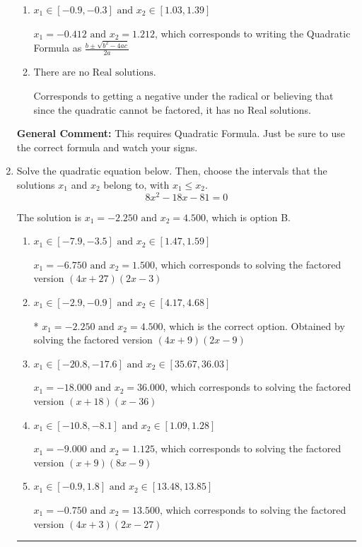 \documentclass{extbook}[14pt]
\newcommand{\litem}[1]{\item #1

\rule{\textwidth}{0.4pt}}
\begin{document}
\begin{enumerate}
{\begin{enumerate}[label=\Alph*.]
 $x_1 = -4.124 \text{ and } x_2 = 12.124$, which corresponds to using the Quadratic Formula with $a=1$
\item \( x_1 \in [-0.9, -0.3] \text{ and } x_2 \in [1.03, 1.39] \)

 $x_1 = -0.412 \text{ and } x_2 = 1.212$, which corresponds to writing the Quadratic Formula as $\frac{b \pm \sqrt{b^2 - 4ac}}{2a}$
\item \( \text{There are no Real solutions.} \)

Corresponds to getting a negative under the radical or believing that since the quadratic cannot be factored, it has no Real solutions.
\end{enumerate}

\textbf{General Comment:} This requires Quadratic Formula. Just be sure to use the correct formula and watch your signs.
}
\litem{
Solve the quadratic equation below. Then, choose the intervals that the solutions $x_1$ and $x_2$ belong to, with $x_1 \leq x_2$.
\[ 8x^{2} -18 x -81 = 0 \]

The solution is \( x_1 = -2.250 \text{ and } x_2 = 4.500 \), which is option B.\begin{enumerate}[label=\Alph*.]
\item \( x_1 \in [-7.9, -3.5] \text{ and } x_2 \in [1.47, 1.59] \)

$x_1 = -6.750 \text{ and } x_2 = 1.500$, which corresponds to solving the factored version $(4x + 27)(2x -3)$
\item \( x_1 \in [-2.9, -0.9] \text{ and } x_2 \in [4.17, 4.68] \)

* $x_1 = -2.250 \text{ and } x_2 = 4.500$, which is the correct option. Obtained by solving the factored version $(4x + 9)(2x -9)$
\item \( x_1 \in [-20.8, -17.6] \text{ and } x_2 \in [35.67, 36.03] \)

$x_1 = -18.000 \text{ and } x_2 = 36.000$, which corresponds to solving the factored version $(x + 18)(x -36)$
\item \( x_1 \in [-10.8, -8.1] \text{ and } x_2 \in [1.09, 1.28] \)

$x_1 = -9.000 \text{ and } x_2 = 1.125$, which corresponds to solving the factored version $(x + 9)(8x -9)$
\item \( x_1 \in [-0.9, 1.8] \text{ and } x_2 \in [13.48, 13.85] \)

$x_1 = -0.750 \text{ and } x_2 = 13.500$, which corresponds to solving the factored version $(4x + 3)(2x -27)$
\end{enumerate}

}
\end{enumerate}
\end{document}

